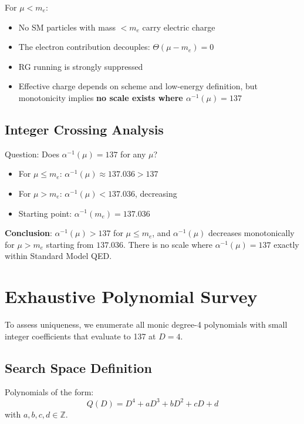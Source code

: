 \documentclass[11pt,a4paper]{article}
\begin{document}
For $\mu < m_e$:
\begin{itemize}
    \item No SM particles with mass $< m_e$ carry electric charge
    \item The electron contribution decouples: $\Theta(\mu - m_e) = 0$
    \item RG running is strongly suppressed
    \item Effective charge depends on scheme and low-energy definition, but monotonicity implies \textbf{no scale exists where $\alpha^{-1}(\mu) = 137$}
\end{itemize}

\subsection{Integer Crossing Analysis}

Question: Does $\alpha^{-1}(\mu) = 137$ for any $\mu$?

\begin{itemize}
    \item For $\mu \leq m_e$: $\alpha^{-1}(\mu) \approx 137.036 > 137$
    \item For $\mu > m_e$: $\alpha^{-1}(\mu) < 137.036$, decreasing
    \item Starting point: $\alpha^{-1}(m_e) = 137.036$
\end{itemize}

\textbf{Conclusion}: $\alpha^{-1}(\mu) > 137$ for $\mu \leq m_e$, and $\alpha^{-1}(\mu)$ decreases monotonically for $\mu > m_e$ starting from $137.036$. There is no scale where $\alpha^{-1}(\mu) = 137$ exactly within Standard Model QED.

\section{Exhaustive Polynomial Survey}

To assess uniqueness, we enumerate all monic degree-4 polynomials with small integer coefficients that evaluate to 137 at $D = 4$.

\subsection{Search Space Definition}

Polynomials of the form:
\begin{equation}
Q(D) = D^4 + aD^3 + bD^2 + cD + d
\end{equation}
with $a, b, c, d \in \mathbb{Z}$.
\end{document}
